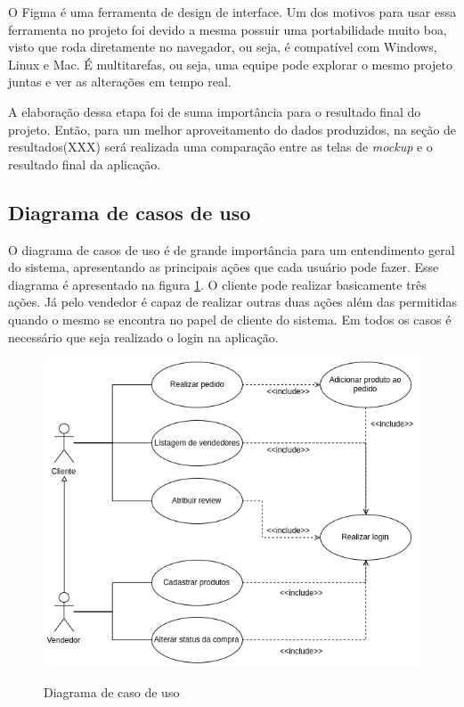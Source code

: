 O Figma é uma ferramenta de design de interface. Um dos motivos para usar essa ferramenta no projeto foi devido a mesma possuir uma portabilidade muito boa, visto que roda diretamente no navegador, ou seja, é compatível com Windows, Linux e Mac. É multitarefas, ou seja, uma equipe pode explorar o mesmo projeto juntas e ver as alterações em tempo real.

A elaboração dessa etapa foi de suma importância para o resultado final do projeto. Então, para um melhor aproveitamento do dados produzidos, na seção de resultados(XXX) será realizada uma comparação entre as telas de \textit{mockup} e o resultado final da aplicação.

\subsection{Diagrama de casos de uso}
O diagrama de casos de uso é de grande importância para um entendimento geral do sistema, apresentando as principais ações que cada usuário pode fazer. Esse diagrama é apresentado na figura \ref{fig:use}. O cliente pode realizar basicamente três ações. Já pelo vendedor é capaz de realizar outras duas ações além das permitidas quando o mesmo se encontra no papel de cliente do sistema. Em todos os casos é necessário que seja realizado o login na aplicação.
\begin{figure}[htbp!]
  \centering
  \caption{Diagrama de caso de uso}
  \includegraphics[width=1\textwidth]{figs/caso_de_uso.png}
    \label{fig:use}
\end{figure}


